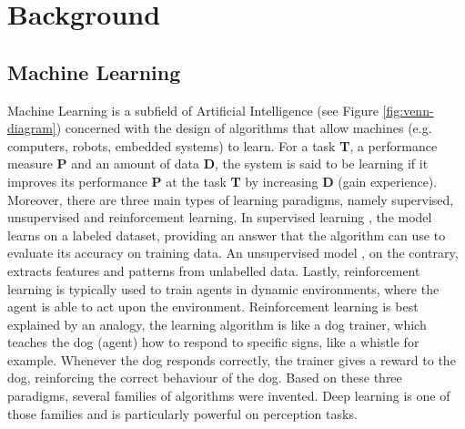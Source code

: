 \chapter{Background} 
\label{chapter-background} 


\section{Machine Learning}
Machine Learning is a subfield of Artificial Intelligence (see Figure \ref{fig:venn-diagram}) concerned with the design of algorithms that allow machines (e.g. computers, robots, embedded systems) to learn. For a task \textbf{T}, a performance measure \textbf{P} and an amount of data \textbf{D}, the system is said to be learning if it improves its performance \textbf{P} at the task \textbf{T} by increasing \textbf{D} (gain experience). Moreover, there are three main types of learning paradigms, namely supervised, unsupervised and reinforcement learning. In supervised learning \citep{supervised}, the model learns on a labeled dataset, providing an answer that the algorithm can use to evaluate its accuracy on training data. An unsupervised model \citep{unsupervised}, on the contrary, extracts features and patterns from unlabelled data. Lastly, reinforcement learning \citep{reinforcement} is typically used to train agents in dynamic environments, where the agent is able to act upon the environment. Reinforcement learning is best explained by an analogy, the learning algorithm is like a dog trainer, which teaches the dog (agent) how to respond to specific signs, like a whistle for example. Whenever the dog responds correctly, the trainer gives a reward to the dog, reinforcing the correct behaviour of the dog. Based on these three paradigms, several families of algorithms were invented. Deep learning \citep{deeplearning-overview} is one of those families and is particularly powerful on perception tasks.
